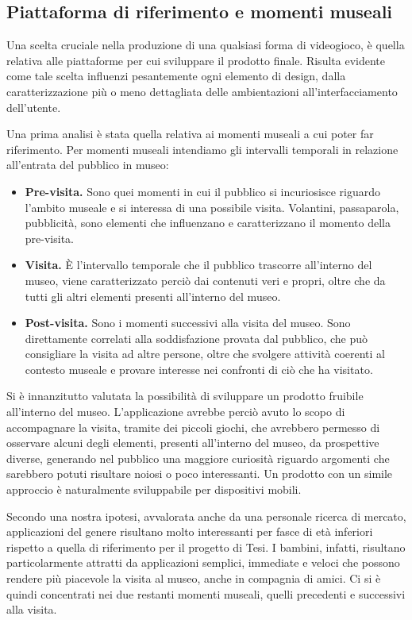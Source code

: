 \subsection{Piattaforma di riferimento e momenti museali}
\label{sec:piattaforma_di_riferimento}

Una scelta cruciale nella produzione di una qualsiasi forma di videogioco, è quella relativa alle piattaforme per cui sviluppare il prodotto finale. Risulta evidente come tale scelta influenzi pesantemente ogni elemento di design, dalla caratterizzazione più o meno dettagliata delle ambientazioni all’interfacciamento dell’utente.

Una prima analisi è stata quella relativa ai momenti museali a cui poter far riferimento. Per momenti museali intendiamo gli intervalli temporali in relazione all’entrata del pubblico in museo:
\begin{itemize}
	\item \textbf{Pre-visita.} Sono quei momenti in cui il pubblico si incuriosisce riguardo l’ambito museale e si interessa di una possibile visita. Volantini, passaparola, pubblicità, sono elementi che influenzano e caratterizzano il momento della pre-visita.
	\item \textbf{Visita.}  È l’intervallo temporale che il pubblico trascorre all’interno del museo, viene caratterizzato perciò dai contenuti veri e propri, oltre che da tutti gli altri elementi presenti all’interno del museo.
	\item \textbf{Post-visita.} Sono i momenti successivi alla visita del museo. Sono direttamente correlati alla soddisfazione provata dal pubblico, che può consigliare la visita ad altre persone, oltre che svolgere attività coerenti al contesto museale e provare interesse nei confronti di ciò che ha visitato.
\end{itemize}
Si è innanzitutto valutata la possibilità di sviluppare un prodotto fruibile all’interno del museo. L’applicazione avrebbe perciò avuto lo scopo di accompagnare la visita, tramite dei piccoli giochi, che avrebbero permesso di osservare alcuni degli elementi, presenti all’interno del museo, da prospettive diverse, generando nel pubblico una maggiore curiosità riguardo argomenti che sarebbero potuti risultare noiosi o poco interessanti. Un prodotto con un simile approccio è naturalmente sviluppabile per dispositivi mobili.

Secondo una nostra ipotesi, avvalorata anche da una personale ricerca di mercato, applicazioni del genere risultano molto interessanti per fasce di età inferiori rispetto a quella di riferimento per il progetto di Tesi.
I bambini, infatti, risultano particolarmente attratti da applicazioni semplici, immediate e veloci che possono rendere più piacevole la visita al museo, anche in compagnia di amici.
Ci si è quindi concentrati nei due restanti momenti museali, quelli precedenti e successivi alla visita.

